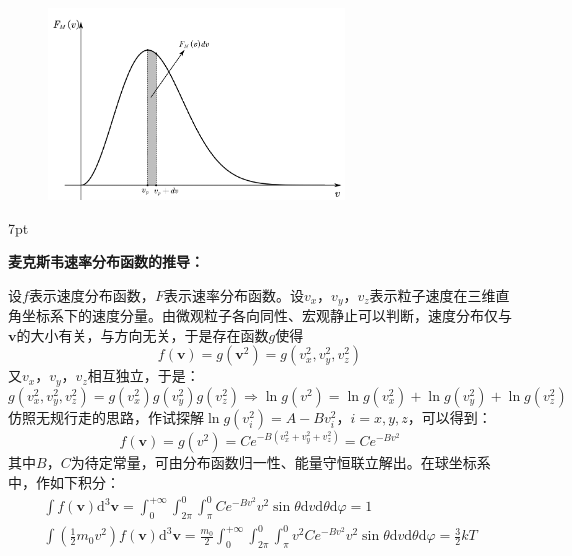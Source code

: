 \documentclass[zihao=5,UTF8]{report}
\newenvironment{graybox}{%
\def\FrameCommand{%
\hspace{1pt}%
{\color{gray}\small \vrule width 2pt}%
{\color{graybox_color}\vrule width 4pt}%
\colorbox{graybox_color}%
}%
\MakeFramed{\advance\hsize-\width\FrameRestore}%
\noindent\hspace{-4.55pt}%
\begin{adjustwidth}{}{7pt}%
\vspace{2pt}\vspace{2pt}%
}
{%
\vspace{2pt}\end{adjustwidth}\endMakeFramed%
}
\begin{document}
\begin{figure}[H]
    \centering
    \includegraphics[width=0.7\textwidth]{pic/麦克斯韦速率分布函数.pdf}
    \label{麦克斯韦速率分布图}
\end{figure}
\begin{graybox}
    \textbf{麦克斯韦速率分布函数的推导：}\par
    设$f$表示速度分布函数，$F$表示速率分布函数。设$v_x$，$v_y$，$v_z$表示粒子速度在三维直角坐标系下的速度分量。由微观粒子各向同性、宏观静止可以判断，速度分布仅与$\boldsymbol{v}$的大小有关，与方向无关，于是存在函数$g$使得
    \begin{equation}
        f(\boldsymbol{v}) = g(\boldsymbol{v}^2) = g(v_x^2,v_y^2,v_z^2)
    \end{equation}
    又$v_x$，$v_y$，$v_z$相互独立，于是：
    \begin{equation}
        g(v_x^2,v_y^2,v_z^2) = g(v_x^2)g(v_y^2)g(v_z^2)\Longrightarrow \ln g(v^2) = \ln g(v_x^2) + \ln g(v_y^2)+\ln g(v_z^2)
    \end{equation}
    仿照无规行走的思路，作试探解$\ln g(v_i^2) = A-Bv_i^2$，$i = x,y,z$，可以得到：
    \begin{equation}
        f(\boldsymbol{v}) = g(v^2) = Ce^{-B(v_x^2 + v_y^2 +v_z^2)} = Ce^{-Bv^2}
    \end{equation}
    其中$B$，$C$为待定常量，可由分布函数归一性、能量守恒联立解出。在球坐标系中，作如下积分：
    \begin{gather}
        \int f(\boldsymbol{v})\mathrm{d}^3\boldsymbol{v} = \int_{0}^{+\infty} \int_{2\pi}^{0}\int_{\pi}^{0} Ce^{-Bv^2}v^2\sin \theta \mathrm{d}v\mathrm{d}\theta\mathrm{d}\varphi = 1\\
        \int (\frac{1}{2}m_0v^2)f(\boldsymbol{v})\mathrm{d}^3\boldsymbol{v} = \frac{m_0}{2}\int_{0}^{+\infty} \int_{2\pi}^{0}\int_{\pi}^{0} v^2Ce^{-Bv^2}v^2\sin \theta \mathrm{d}v\mathrm{d}\theta\mathrm{d}\varphi = \frac{3}{2}kT
    \end{gather}

\end{graybox}
\end{document}
